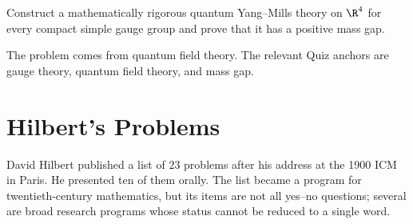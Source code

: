     \begin{openproblem}
        Construct a mathematically rigorous quantum Yang--Mills theory on
        $\R^4$ for every compact simple gauge group and prove that it has a
        positive mass gap.
    \end{openproblem}

    \begin{remark}
        The problem comes from quantum field theory. The relevant Quiz anchors
        are gauge theory, quantum field theory, and mass gap.
    \end{remark}

    \section*{Hilbert's Problems}

    David Hilbert published a list of $23$ problems after his address at the
    1900 ICM in Paris. He presented ten of them orally. The list became a
    program for twentieth-century mathematics, but its items are not all
    yes--no questions; several are broad research programs whose status cannot
    be reduced to a single word.

    \vspace{1em}

